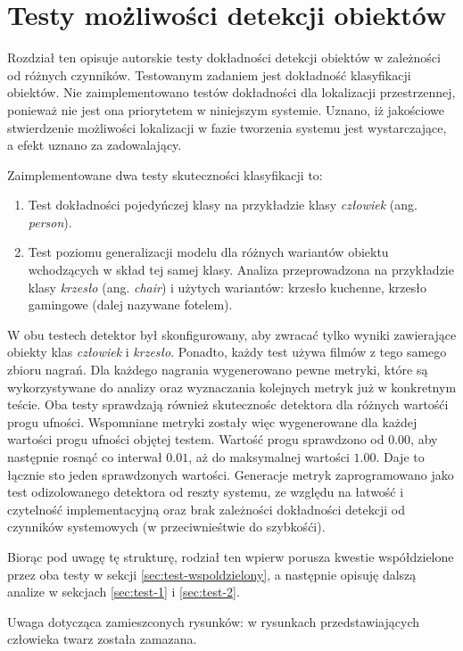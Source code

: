\chapter{Testy możliwości detekcji obiektów}
Rozdział ten opisuje autorskie testy dokładności detekcji obiektów w zależności od różnych czynników. Testowanym zadaniem jest dokładność klasyfikacji obiektów. Nie zaimplementowano testów dokładności dla lokalizacji przestrzennej, ponieważ nie jest ona priorytetem w niniejszym systemie. Uznano, iż jakościowe stwierdzenie możliwości lokalizacji w fazie tworzenia systemu jest wystarczające, a efekt uznano za zadowalający. 

Zaimplementowane dwa testy skuteczności klasyfikacji to:
\begin{enumerate}
    \item Test dokładności pojedyńczej klasy na przykładzie klasy \emph{człowiek} (ang. \emph{person}). 
    \item  Test poziomu generalizacji modelu dla różnych wariantów obiektu wchodzących w skład tej samej klasy. Analiza przeprowadzona na przykładzie klasy \emph{krzesło} (ang. \emph{chair}) i użytych wariantów: krzesło kuchenne, krzesło gamingowe (dalej nazywane fotelem). 
\end{enumerate}
W obu testech detektor był skonfigurowany, aby zwracać tylko wyniki zawierające obiekty klas \emph{człowiek} i \emph{krzesło}. Ponadto, każdy test używa filmów z tego samego zbioru nagrań. Dla każdego nagrania wygenerowano pewne metryki, które są wykorzystywane do analizy oraz wyznaczania kolejnych metryk już w konkretnym teście. Oba testy sprawdzają również skutecznośc detektora dla różnych wartośći progu ufności. Wspomniane metryki zostały więc wygenerowane dla każdej wartości progu ufności objętej testem. Wartość progu sprawdzono od $0.00$, aby następnie rosnąć co interwał $0.01$, aż do maksymalnej wartości $1.00$. Daje to łącznie sto jeden sprawdzonych wartości. Generacje metryk zaprogramowano jako test odizolowanego detektora od reszty systemu, ze względu na łatwość i czytelność implementacyjną oraz brak zależności dokładności detekcji od czynników systemowych (w przeciwnieśtwie do szybkośći).  

Biorąc pod uwagę tę strukturę, rodział ten wpierw porusza kwestie współdzielone przez oba testy w sekcji \ref{sec:test-wspoldzielony}, a następnie opisuję dalszą analize w sekcjach \ref{sec:test-1} i \ref{sec:test-2}.
 
Uwaga dotycząca zamieszconych rysunków: w rysunkach przedstawiających człowieka twarz została zamazana.


